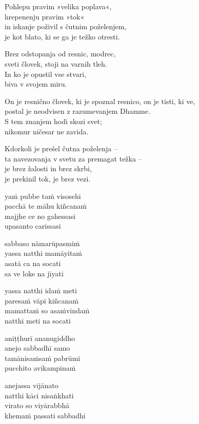 Pohlepu pravim »velika poplava«,\\
hrepenenju pravim »tok«\\
in iskanje poživil s čutnim poželenjem,\\
je kot blato, ki se ga je težko otresti.

Brez odstopanja od resnic, modrec,\\
sveti človek, stoji na varnih tleh.\\
In ko je opustil vse stvari,\\
biva v svojem miru.

On je resnično človek, ki je spoznal resnico, on je tisti, ki ve,\\
postal je neodvisen z razumevanjem Dhamme.\\
S tem znanjem hodi skozi svet;\\
nikomur ničesar ne zavida.

Kdorkoli je prešel čutna poželenja --\\
ta navezovanja v svetu za premagat težka --\\
je brez žalosti in brez skrbi,\\
je prekinil tok, je brez vezi.


\clearpage

yaṁ pubbe taṁ visosehi\\
pacchā te māhu kiñcanaṁ\\
majjhe ce no gahessasi\\
upasanto carissasi

sabbaso nāmarūpasmiṁ\\
yassa natthi mamāyitaṁ\\
asatā ca na socati\\
sa ve loke na jīyati

yassa natthi idaṁ meti\\
paresaṁ vāpi kiñcanaṁ\\
mamattaṁ so asaṁvindaṁ\\
natthi meti na socati

aniṭṭhurī ananugiddho\\
anejo sabbadhī samo\\
tamānisaṁsaṁ pabrūmi\\
pucchito avikampinaṁ

anejassa vijānato\\
natthi kāci nisaṅkhati\\
virato so viyārabbhā\\
khemaṁ passati sabbadhi

